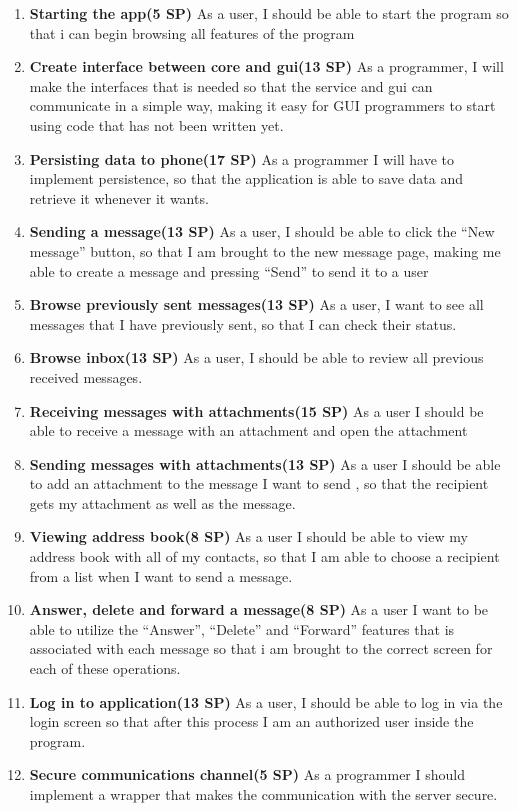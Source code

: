 \documentclass[a4paper, norsk, 12pt]{article}
\newcommand{\SP}[1]{(#1 SP)}
\begin{document}
		\begin{enumerate}
			\item {\bf Starting the app\SP{5}} As a user, I should be able to start the program so that i can begin browsing all features of the program
			\item {\bf Create interface between core and gui\SP{13}} As a programmer, I will make the interfaces that is needed so that the service and gui can communicate in a simple way, making it easy for GUI programmers to start using code that has not been written yet.
			\item {\bf Persisting data to phone\SP{17}} As a programmer I will have to implement persistence, so that the application is able to save data and retrieve it whenever it wants.
			\item {\bf Sending a message\SP{13}} As a user, I should be able to click the ``New message'' button, so that I am brought to the new message page, making me able to create a message and pressing ``Send'' to send it to a user
			\item {\bf Browse previously sent messages\SP{13}} As a user, I want to see all messages that I have previously sent, so that I can check their status.
			\item {\bf Browse inbox\SP{13}} As a user, I should be able to review all previous received messages.
			\item {\bf Receiving messages with attachments\SP{15}} As a user I should be able to receive a message with an attachment and open the attachment
			\item {\bf Sending messages with attachments\SP{13}} As a user I should be able to add an attachment to the message I want to send , so that the recipient gets my attachment as well as the message.
			\item {\bf Viewing address book\SP{8}} As a user I should be able to view my address book with all of my contacts, so that I am able to choose a recipient from a list when I want to send a message.
			\item {\bf Answer, delete and forward a message\SP{8}} As a user I want to be able to utilize the ``Answer'', ``Delete'' and ``Forward'' features that is associated with each message so that i am brought to the correct screen for each of these operations.
			\item {\bf Log in to application\SP{13}} As a user, I should be able to log in via the login screen so that after this process I am an authorized user inside the program.
			\item {\bf Secure communications channel\SP{5}} As a programmer I should implement a wrapper that makes the communication with the server secure.

\end{enumerate}
\end{document}
